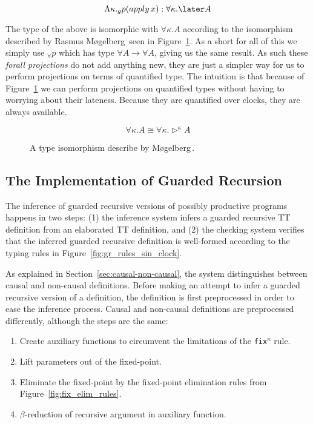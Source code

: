 \[
\Lambda \kappa . _gp (apply\,x) : \forall \kappa . \later A
\]

The type of the above is isomorphic with $\forall \kappa . A$ according to the
isomorphism described by Rasmus M\o gelberg\,\cite{Mogelberg:2014} seen in
Figure~\ref{fig:quantified_later_iso}. As a short for all of this we simply use
$_\forall p$ which has type $\forall A \rightarrow \forall A$, giving us the
same result. As such these \emph{forall projections} do not add anything new,
they are just a simpler way for us to perform projections on terms of quantified
type. The intuition is that because of Figure~\ref{fig:quantified_later_iso} we
can perform projections on quantified types without having to worrying about
their lateness. Because they are quantified over clocks, they are always available.

\begin{figure}[h]
\[
\forall \kappa .A\cong \forall \kappa .\rhd ^\kappa A
\]
  \caption{A type isomorphism describe by M\o gelberg\,\cite{Mogelberg:2014}.}
  \label{fig:quantified_later_iso}
\end{figure}


\subsection{The Implementation of Guarded Recursion}
\label{sec:impl-guard-recurs}

The inference of guarded recursive versions of possibly productive programs
happens in two steps: (1) the inference system infers a guarded
recursive TT definition from an elaborated TT definition, and (2) the checking
system verifies that the inferred guarded recursive definition is well-formed
according to the typing rules in Figure~\ref{fig:gr_rules_sin_clock}.

As explained in Section~\ref{sec:causal-non-causal}, the system distinguishes between
causal and non-causal definitions. Before making an attempt to infer a guarded
recursive version of a definition, the definition is first preprocessed in order
to ease the inference process. Causal and non-causal definitions are
preprocessed differently, although the steps are the same:

\begin{enumerate}
\item Create auxiliary functions to circumvent the limitations of the
  \texttt{fix$^\kappa$} rule.
\item Lift parameters out of the fixed-point.
\item Eliminate the fixed-point by the fixed-point elimination rules from
  Figure~\ref{fig:fix_elim_rules}.
\item $\beta$-reduction of recursive argument in auxiliary function.
\end{enumerate}

